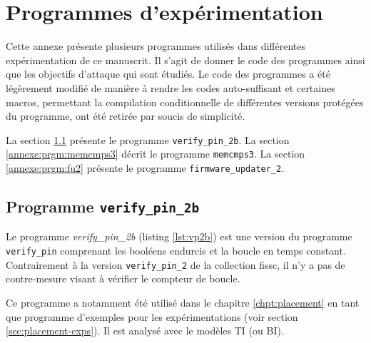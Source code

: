 

\chapter{Programmes d'expérimentation}

    Cette annexe présente plusieurs programmes utilisés dans différentes expérimentation de ce manuscrit.
    Il s'agit de donner le code des programmes ainsi que les objectifs d'attaque qui sont étudiés.
    Le code des programmes a été légèrement modifié de manière à rendre les codes auto-suffisant et certaines macros, permettant la compilation conditionnelle de différentes versions protégées du programme, ont été retirée par soucis de simplicité.

    La section \ref{annexe:prgm:vp2b} présente le programme \texttt{verify\_pin\_2b}.
    La section \ref{annexe:prgm:memcmps3} décrit le programme \texttt{memcmps3}. 
    La section \ref{annexe:prgm:fu2} présente le programme \texttt{firmware\_updater\_2}.

    \section{Programme \texttt{verify\_pin\_2b}}
    \label{annexe:prgm:vp2b}
    
        Le programme \textit{verify\_pin\_2b} (listing \ref{lst:vp2b}) est une version du programme \texttt{verify\_pin} comprenant les booléens endurcis et la boucle en temps constant. Contrairement à la version \texttt{verify\_pin\_2} de la collection \gls{fissc}, il n'y a pas de contre-mesure visant à vérifier le compteur de boucle.
    
        Ce programme a notamment été utilisé dans le chapitre \ref{chpt:placement} en tant que programme d'exemples pour les expérimentations (voir section \ref{sec:placement-exps}).
        Il est analysé avec le modèles \gls{TI} (ou \gls{BI}).

